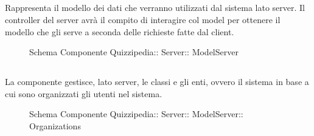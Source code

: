 \subsection{}
Rappresenta il modello dei dati che verranno utilizzati dal sistema lato server. 
Il controller del server avrà il compito di interagire col model per ottenere il modello che gli serve a seconda delle richieste fatte dal client.
\begin{figure}[H]
\centering
\noindent{}
\caption[Schema Componente Quizzipedia::Server::ModelServer]{Schema Componente Quizzipedia:: Server:: ModelServer}
\end{figure}
\subsection{}
La componente gestisce, lato server, le classi e gli enti, ovvero il sistema in base a cui sono organizzati gli utenti nel sistema.
\begin{figure}[H]
\centering
\noindent{}
\caption[Schema Componente Quizzipedia::Server::ModelServer::Organizations]{Schema Componente Quizzipedia:: Server:: ModelServer:: Organizations}
\end{figure}
